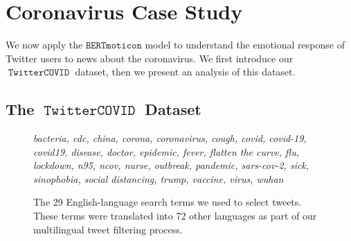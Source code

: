 \documentclass[11pt]{article}
\newcommand{\bertmoji}{\texttt{BERTmoticon}}
\DeclareMathOperator{\corona}{\texttt{TwitterCOVID}}
\begin{document}

\section{Coronavirus Case Study}
\label{sec:casestudy}

We now apply the $\bertmoji$ model to understand the emotional response of Twitter users to news about the coronavirus.
We first introduce our $\corona$ dataset,
then we present an analysis of this dataset.

\subsection{The $\corona$ Dataset}

\begin{figure}
    \footnotesize
    \emph{%
    bacteria,
    cdc,
    china,
    corona,
    coronavirus,
    cough,
    covid,
    covid-19,
    covid19,
    disease,
    doctor,
    epidemic,
    fever,
    flatten the curve,
    flu,
    lockdown,
    n95,
    ncov,
    nurse,
    outbreak,
    pandemic,
    sars-cov-2,
    sick,
    sinophobia,
    social distancing,
    trump,
    vaccine,
    virus,
    wuhan
}
    \caption{
        The 29 English-language search terms we used to select tweets.
        These terms were translated into 72 other languages as part of our multilingual tweet filtering process.
    }
    \label{fig:terms}
\end{figure}
\end{document}
